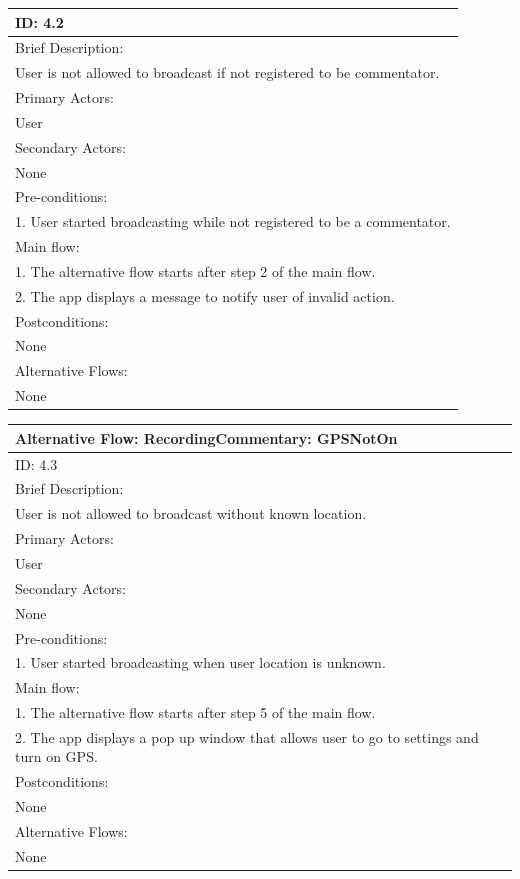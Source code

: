 \documentclass{article}
\begin{document}
\begin{flushleft}
\begin{longtable}[l]{|l|}
\hline
ID: 4.2\\
\hline
Brief Description: \\
User is not allowed to broadcast if not registered to be commentator.\\
\hline
Primary Actors:\\
User\\
\hline
Secondary Actors:\\
None\\
\hline
Pre-conditions:\\
1. User started broadcasting while not registered to be a commentator.\\
\hline
Main flow:\\
1. The alternative flow starts after step 2 of the main flow.\\
2. The app displays a message to notify user of invalid action.\\
\hline
Postconditions:\\
None\\
\hline
Alternative Flows:\\
None\\
\hline
\end{longtable}
\begin{longtable}[l]{|l|}
\hline
Alternative Flow: RecordingCommentary: GPSNotOn\\
\hline
ID: 4.3\\
\hline
Brief Description: \\
User is not allowed to broadcast without known location.\\
\hline
Primary Actors:\\
User\\
\hline
Secondary Actors:\\
None\\
\hline
Pre-conditions:\\
1. User started broadcasting when user location is unknown.\\
\hline
Main flow:\\
1. The alternative flow starts after step 5 of the main flow.\\
2. The app displays a pop up window that allows user to go to settings and turn on GPS.\\
\hline
Postconditions:\\
None\\
\hline
Alternative Flows:\\
None\\
\hline
\end{longtable}
\begin{longtable}[l]{|l|}

\end{longtable}
\end{flushleft}
\end{document}
